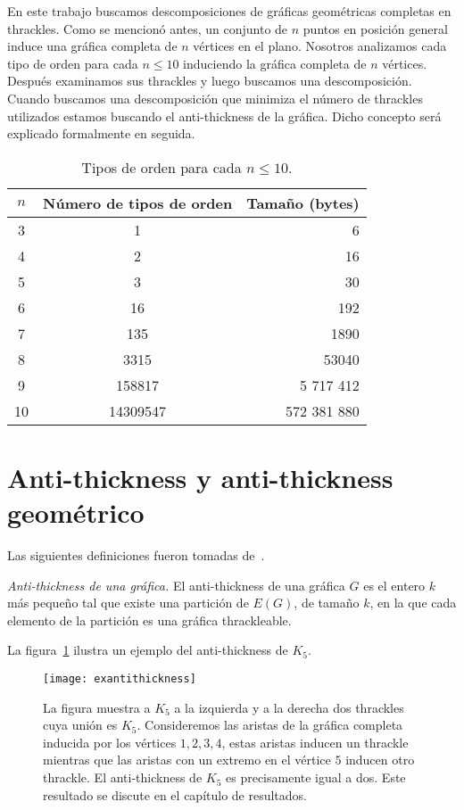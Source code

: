 En este trabajo buscamos descomposiciones de gráficas geométricas completas en
thrackles. Como se mencionó antes, un conjunto de $n$ puntos en posición general
induce una gráfica completa de $n$ vértices en el plano. Nosotros analizamos
cada tipo de orden para cada $n\leq 10$ induciendo la gráfica completa de $n$
vértices. Después examinamos sus thrackles y luego buscamos una descomposición.
Cuando buscamos una descomposición que minimiza el número de thrackles
utilizados estamos buscando el anti-thickness de la gráfica. Dicho concepto
será explicado formalmente en seguida.
\begin{table}[ht]
  \centering
  \begin{tabular}{|c|c|r|}
  \hline
  $n$ & Número de tipos de orden & Tamaño (bytes)   \\ \hline
  3     & 1                   & 6       \\ \hline
  4     & 2                   & 16      \\ \hline
  5     & 3                   & 30      \\ \hline
  6     & 16                  & 192     \\ \hline
  7     & 135                 & 1890    \\ \hline
  8     & 3315                & 53040   \\ \hline
  9     & 158817              &	5 717 412   \\\hline
  10    & 14309547            & 572 381 880 \\ \hline
  \end{tabular}
  \caption{Tipos de orden para cada $n\leq10$.}
  \label{tab:ots}
\end{table}

\section{Anti-thickness y anti-thickness geométrico} \label{secc:anti-thickness}
Las siguientes definiciones fueron tomadas de~\cite{Dujmovic2017}.
\begin{definition}{\emph{Anti-thickness de una gráfica.}}
  El anti-thickness de una gráfica $G$ es el entero $k$ más pequeño tal que
  existe una partición de $E(G)$, de tamaño $k$, en la que cada elemento de la
  partición es una gráfica thrackleable.
\end{definition}
La figura~\ref{fig:exantithickness} ilustra un ejemplo del anti-thickness de
$K_5$.
\begin{figure}[htpb]
  \centering
  \texttt{[image: exantithickness]}
  \caption{La figura muestra a $K_5$ a la izquierda y a la derecha dos thrackles
  cuya unión es $K_5$. Consideremos las aristas de la gráfica completa inducida por los vértices $1,2,3,4$,
  estas aristas inducen un thrackle mientras que las aristas con un extremo en el vértice $5$ inducen otro thrackle.
  El anti-thickness de $K_5$ es precisamente igual a dos. Este resultado se discute en el capítulo de resultados.}
  \label{fig:exantithickness}
\end{figure}


